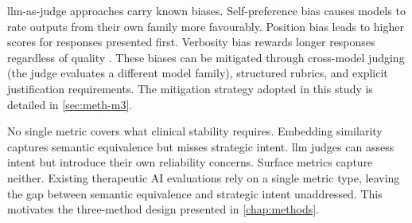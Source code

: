 \gls{llm}-as-judge approaches carry known biases. Self-preference bias
causes models to rate outputs from their own family more favourably.
Position bias leads to higher scores for responses presented first.
Verbosity bias rewards longer responses regardless of quality
\parencite{LVLA9LZU}. These biases can be mitigated through cross-model
judging (the judge evaluates a different model family), structured rubrics,
and explicit justification requirements. The mitigation strategy adopted in
this study is detailed in \autoref{sec:meth-m3}.

No single metric covers what clinical stability requires. Embedding
similarity captures semantic equivalence but misses strategic intent.
\gls{llm} judges can assess intent but introduce their own reliability
concerns. Surface metrics capture neither. Existing therapeutic AI
evaluations rely on a single metric type, leaving the gap between semantic
equivalence and strategic intent unaddressed. This motivates the
three-method design presented in \autoref{chap:methods}.

